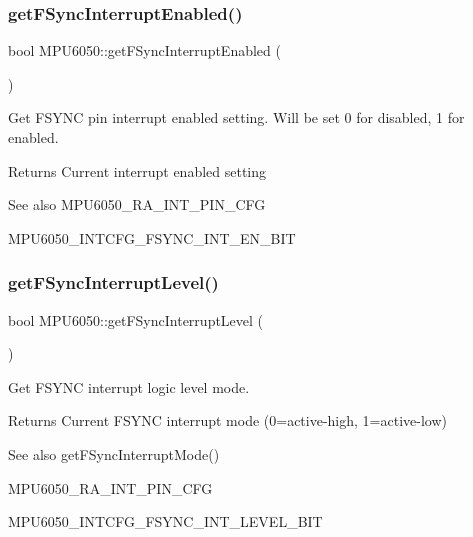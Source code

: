 \subsubsection{\texorpdfstring{getFSyncInterruptEnabled()}{getFSyncInterruptEnabled()}}
{\footnotesize\ttfamily bool M\+P\+U6050\+::get\+F\+Sync\+Interrupt\+Enabled (\begin{DoxyParamCaption}{ }\end{DoxyParamCaption})}

Get F\+S\+Y\+NC pin interrupt enabled setting. Will be set 0 for disabled, 1 for enabled. \begin{DoxyReturn}{Returns}
Current interrupt enabled setting 
\end{DoxyReturn}
\begin{DoxySeeAlso}{See also}
M\+P\+U6050\+\_\+\+R\+A\+\_\+\+I\+N\+T\+\_\+\+P\+I\+N\+\_\+\+C\+FG 

M\+P\+U6050\+\_\+\+I\+N\+T\+C\+F\+G\+\_\+\+F\+S\+Y\+N\+C\+\_\+\+I\+N\+T\+\_\+\+E\+N\+\_\+\+B\+IT 
\end{DoxySeeAlso}
\mbox{\label{class_m_p_u6050_a60fc85d4f27f99d07ffb9543d5e5f347}} 
\subsubsection{\texorpdfstring{getFSyncInterruptLevel()}{getFSyncInterruptLevel()}}
{\footnotesize\ttfamily bool M\+P\+U6050\+::get\+F\+Sync\+Interrupt\+Level (\begin{DoxyParamCaption}{ }\end{DoxyParamCaption})}

Get F\+S\+Y\+NC interrupt logic level mode. \begin{DoxyReturn}{Returns}
Current F\+S\+Y\+NC interrupt mode (0=active-\/high, 1=active-\/low) 
\end{DoxyReturn}
\begin{DoxySeeAlso}{See also}
get\+F\+Sync\+Interrupt\+Mode() 

M\+P\+U6050\+\_\+\+R\+A\+\_\+\+I\+N\+T\+\_\+\+P\+I\+N\+\_\+\+C\+FG 

M\+P\+U6050\+\_\+\+I\+N\+T\+C\+F\+G\+\_\+\+F\+S\+Y\+N\+C\+\_\+\+I\+N\+T\+\_\+\+L\+E\+V\+E\+L\+\_\+\+B\+IT 
\end{DoxySeeAlso}
\mbox{\label{class_m_p_u6050_a0fe2dad60c170cee7d614e08f243ffd0}} 
